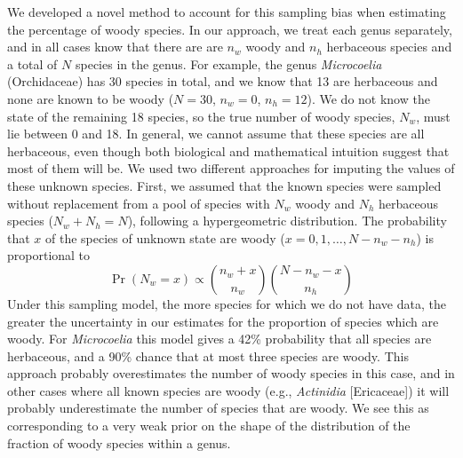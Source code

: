 \documentclass[a4paper,12pt]{article}
\begin{document}
We developed a novel method to account for this sampling bias when
estimating the percentage of woody species.  In our approach, we treat
each genus separately, and in all cases know that there are are $n_w$
woody and $n_h$ herbaceous species and a total of $N$ species in the genus.
%
For example, the genus \textit{Microcoelia} (Orchidaceae) has 30
species in total, and we know that 13 are herbaceous and none are
known to be woody ($N = 30$, $n_w = 0$, $n_h = 12$). We do not know
the state of the remaining 18 species, so the true number of woody
species, $N_w$, must lie between 0 and 18. In general, we cannot
assume that these species are all herbaceous, even though both
biological and mathematical intuition suggest that most of them will
be.
We used two different approaches for imputing the values of these
unknown species. First, we assumed that the known species were sampled
without replacement from a pool of species with $N_w$ woody and $N_h$
herbaceous species ($N_w + N_h = N$), following a hypergeometric
distribution. The probability that $x$ of the species of unknown state
are woody ($x = 0, 1, \ldots, N - n_w - n_h$) is proportional to
\begin{equation}
  \Pr(N_w = x) \propto {n_w + x \choose n_w}
  {N - n_w - x \choose n_h}
\end{equation}
Under this sampling model, the more species for which we do not have data,
the greater the uncertainty in our estimates for the proportion of species
which are woody.
%
For \textit{Microcoelia} this model gives a 42\% probability that all
species are herbaceous, and a 90\% chance that at most three species
are woody.
This approach probably overestimates the number of woody species in
this case, and in other cases where all known species are woody (e.g.,
\textit{Actinidia} [Ericaceae]) it will probably underestimate the
number of species that are woody. We see this as corresponding to a
very weak prior on the shape of the distribution of the fraction of
woody species within a genus.
\end{document}
